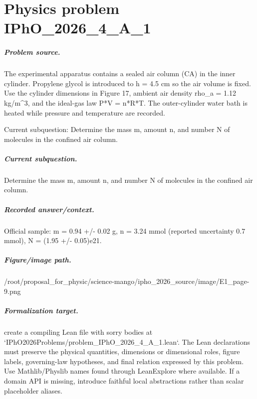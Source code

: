 
\chapter{Physics problem IPhO\_2026\_4\_A\_1}
\label{ch:IPhO2026Problems_problem_IPhO_2026_4_A_1}

\paragraph{Problem source.}
The experimental apparatus contains a sealed air column (CA) in the inner
cylinder.  Propylene glycol is introduced to h = 4.5 cm so the air volume is
fixed.  Use the cylinder dimensions in Figure 17, ambient air density
rho\_a = 1.12 kg/m\textasciicircum{}3, and the ideal-gas law P*V = n*R*T.  The outer-cylinder
water bath is heated while pressure and temperature are recorded.

Current subquestion:
Determine the mass m, amount n, and number N of molecules in the confined air column.

\paragraph{Current subquestion.}
Determine the mass m, amount n, and number N of molecules in the confined air column.

\paragraph{Recorded answer/context.}
Official sample: m = 0.94 +/- 0.02 g, n = 3.24 mmol (reported uncertainty 0.7 mmol), N = (1.95 +/- 0.05)e21.

\paragraph{Figure/image path.}
/root/proposal\_for\_physic/science-mango/ipho\_2026\_source/image/E1\_page-9.png

\paragraph{Formalization target.}
create a compiling Lean file with sorry bodies at `IPhO2026Problems/problem\_IPhO\_2026\_4\_A\_1.lean`.
The Lean declarations must preserve the physical quantities, dimensions or dimensional roles, figure labels, governing-law hypotheses, and final relation expressed by this problem.
Use Mathlib/Physlib names found through LeanExplore where available. If a domain API is missing, introduce faithful local abstractions rather than scalar placeholder aliases.

